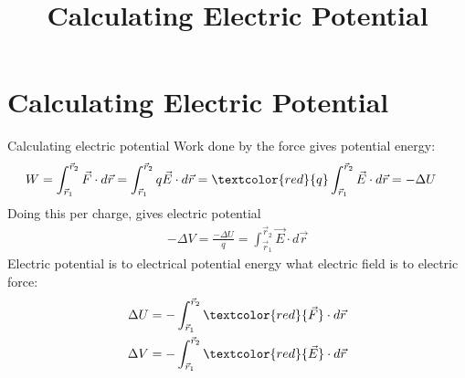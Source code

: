 \documentclass[aspectratio=169,
hyperref={colorlinks,urlcolor=blue}
]{beamer}
\begin{document}




\section{Calculating Electric Potential}
\label{sec:calculatingelectricpotential}
\title{Calculating Electric Potential}


\begin{frame}
\titlepage
\thispagestyle{empty}
\end{frame}







\begin{frame}{Calculating electric potential}
Work done by the force gives potential energy:
\begin{align*}
W&=\int_{\vec r_1}^{\vec r_2}\vec F\cdot d\vec r = \int_{\vec r_1}^{\vec r_2}q\vec E\cdot d\vec r = \textcolor{red}{q}\int_{\vec r_1}^{\vec r_2}\vec E\cdot d\vec r = -\Delta U 
\end{align*}
Doing this per charge, gives electric potential
\begin{align*}
-\Delta V = \frac{-\Delta U}{q}=\int_{\vec r_1}^{\vec r_2}\vec E\cdot d\vec r 
\end{align*}
Electric potential is to electrical potential energy what electric field is to electric force:
\begin{align*}
\Delta U &= -\int_{\vec r_1}^{\vec r_2} \textcolor{red}{\vec F}\cdot d\vec r\\
\Delta V &= -\int_{\vec r_1}^{\vec r_2} \textcolor{red}{\vec E}\cdot d\vec r
\end{align*}
\end{frame}


\end{document}
